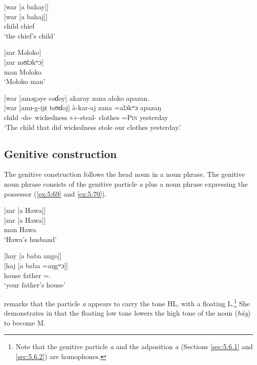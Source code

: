 \ea \label{ex:5:66}
{}[war  [a  bahay]]\\
\gll  {}[war  [a  bahaj]]\\
      child  {\GEN}  chief\\
\glt  ‘the chief’s child’
\z

\ea \label{ex:5:67}
{}[zar  Məloko]\\
\gll  {}[zar    mʊlɔkʷɔ]\\
      man    Moloko\\
\glt  ‘Moloko man’
\z

\ea \label{ex:5:68}
{}[war  [aməgəye  cəɗoy]  akaray  zana  aloko  apazan.\\
\gll  {}[war  [amɪ-g-ijɛ  tsʊɗoj]    à-kar-aj    zana  =alɔkʷɔ  apazaŋ\\
      child  {\DEP}-do-{\CL}  wickedness  \textsc{s}+{\PFV}-steal{}-{\CL}  clothes  =\textsc{Pin}  yesterday\\
\glt  ‘The child that did wickedness stole our clothes yesterday.’
\z

\subsection{Genitive construction}\label{sec:5.4.1}
\hypertarget{RefHeading1211741525720847}{}
The genitive construction follows the head noun in a noun phrase. The genitive noun phrase consists of the genitive particle \textit{a} plus a noun phrase expressing the possessor (\ref{ex:5:69} and \ref{ex:5:70}). 

\ea \label{ex:5:69}
{}[zar  [a  Hawa]]\\
\gll  {}[zar    [a  Hawa]]\\
      man    {\GEN}  Hawa\\
\glt  ‘Hawa’s husband’
\z

\ea \label{ex:5:70}
{}[hay  [a  baba  ango]]\\
\gll  {}[haj    [a  baba  =aŋgʷɔ]]\\
      house  {\GEN}  father  ={\twoS}.{\POSS}\\
\glt  ‘your father’s house’
\z

\citet{Bow1997c} remarks that the particle \textit{a} appears to carry the tone HL, with a floating L.\footnote{Note that the genitive particle \textit{a} and the adposition \textit{a} (Sections \ref{sec:5.6.1} and \ref{sec:5.6.2}) are homophones.} She demonstrates in  that the floating low tone lowers the high tone of the noun (\textit{háy}) to become M. 

